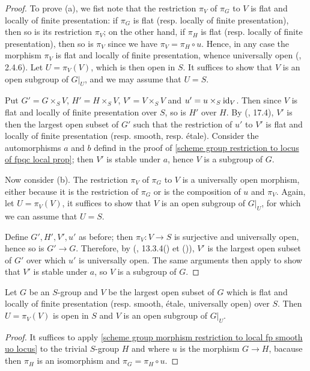 \begin{proof}
To prove (a), we fist note that the restriction $\pi_V$ of $\pi_G$ to $V$ is flat and locally of finite presentation: if $\pi_G$ is flat (resp. locally of finite presentation), then so is its restriction $\pi_V$; on the other hand, if $\pi_H$ is flat (resp. locally of finite presentation), then so is $\pi_V$ since we have $\pi_V=\pi_H\circ u$. Hence, in any case the morphism $\pi_V$ is flat and locally of finite presentation, whence universally open (\cite{EGA4-2}, 2.4.6). Let $U=\pi_V(V)$, which is then open in $S$. It suffices to show that $V$ is an open subgroup of $G|_U$, and we may assume that $U=S$.\par
Put $G'=G\times_SV$, $H'=H\times_SV$, $V'=V\times_SV$ and $u'=u\times_S\operatorname{id}_V$. Then since $V$ is flat and locally of finite presentation over $S$, so is $H'$ over $H$. By (\cite{EGA4-4}, 17.4), $V'$ is then the largest open subset of $G'$ such that the restriction of $u'$ to $V'$ is flat and locally of finite presentation (resp. smooth, resp. \'etale). Consider the automorphisms $a$ and $b$ defind in the proof of \cref{scheme group restriction to locus of fpqc local prop}; then $V'$ is stable under $a$, hence $V$ is a subgroup of $G$.\par
Now consider (b). The restriction $\pi_V$ of $\pi_G$ to $V$ is a universally open morphism, either because it is the restriction of $\pi_G$ or is the composition of $u$ and $\pi_V$. Again, let $U=\pi_V(V)$, it suffices to show that $V$ is an open subgroup of $G|_U$, for which we can assume that $U=S$.\par
Define $G',H',V',u'$ as before; then $\pi_V:V\to S$ is surjective and universally open, hence so is $G'\to G$. Therefore, by (\cite{EGA4-3}, 13.3.4() et ()), $V'$ is the largest open subset of $G'$ over which $u'$ is universally open. The same arguments then apply to show that $V'$ is stable under $a$, so $V$ is a subgroup of $G$.
\end{proof}

\begin{corollary}\label{scheme group local fp smooth uo locus is open subgroup}
Let $G$ be an $S$-group and $V$ be the largest open subset of $G$ which is flat and locally of finite presentation (resp. smooth, \'etale, universally open) over $S$. Then $U=\pi_V(V)$ is open in $S$ and $V$ is an open subgroup of $G|_U$.
\end{corollary}
\begin{proof}
It suffices to apply \cref{scheme group morphism restriction to local fp smooth uo locus} to the trivial $S$-group $H$ and where $u$ is the morphism $G\to H$, bacause then $\pi_H$ is an isomorphism and $\pi_G=\pi_H\circ u$.
\end{proof}

